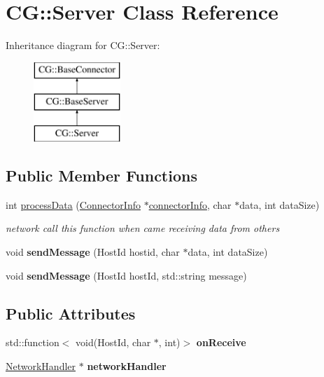 \hypertarget{class_c_g_1_1_server}{}\section{CG\+:\+:Server Class Reference}
\label{class_c_g_1_1_server}
Inheritance diagram for CG\+:\+:Server\+:\begin{figure}[H]
\begin{center}
\leavevmode
\includegraphics[height=3.000000cm]{class_c_g_1_1_server}
\end{center}
\end{figure}
\subsection*{Public Member Functions}
\begin{DoxyCompactItemize}
\item 
int \mbox{\hyperlink{class_c_g_1_1_server_a846ff65e508699775c54a81091ec76a3}{process\+Data}} (\mbox{\hyperlink{class_c_g_1_1_connector_info}{Connector\+Info}} $\ast$\mbox{\hyperlink{class_c_g_1_1_base_connector_ae68321ba56404549f2e655238035ed8d}{connector\+Info}}, char $\ast$data, int data\+Size)
\begin{DoxyCompactList}\small\item\em network call this function when came receiving data from others \end{DoxyCompactList}\item 
\mbox{\label{class_c_g_1_1_server_a3d662cb8806e3577402da3abdfc2e5cf}} 
void {\bfseries send\+Message} (Host\+Id hostid, char $\ast$data, int data\+Size)
\item 
\mbox{\label{class_c_g_1_1_server_a1ae5a22ee3d8a272c2903e53639f61c6}} 
void {\bfseries send\+Message} (Host\+Id host\+Id, std\+::string message)
\end{DoxyCompactItemize}
\subsection*{Public Attributes}
\begin{DoxyCompactItemize}
\item 
\mbox{\label{class_c_g_1_1_server_a4c1f26594dc7c336ad2c8e85e1f47f1e}} 
std\+::function$<$ void(Host\+Id, char $\ast$, int)$>$ {\bfseries on\+Receive}
\item 
\mbox{\label{class_c_g_1_1_server_aa120a84948312f9ea3931a9b8d2f004e}} 
\mbox{\hyperlink{class_c_g_1_1_network_handler}{Network\+Handler}} $\ast$ {\bfseries network\+Handler}
\end{DoxyCompactItemize}
